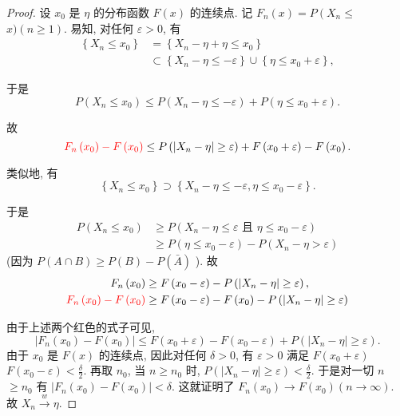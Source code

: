 \begin{proof}
    设 $x_0$ 是 $\eta$ 的分布函数 $F(x)$ 的连续点. 记 $F_n(x)=P\left(X_n \leq\right.$ $x)(n \geq 1)$. 易知, 对任何 $\varepsilon>0$, 有
$$
\begin{aligned}
\left\{X_n \leq x_0\right\} & =\left\{X_n-\eta+\eta \leq x_0\right\} \\
& \subset\left\{X_n-\eta \leq-\varepsilon\right\} \cup\left\{\eta \leq x_0+\varepsilon\right\},
\end{aligned}
$$

于是
$$
P\left(X_n \leq x_0\right) \leq P\left(X_n-\eta \leq-\varepsilon\right)+P\left(\eta \leq x_0+\varepsilon\right) .
$$

故$${{\color{red}F_n\left(x_0\right)-F\left(x_0\right)}} \leq P\left(\left|X_n-\eta\right| \geq \varepsilon\right)+F\left(x_0+\varepsilon\right)-F\left(x_0\right) .$$

类似地, 有
$$
\left\{X_n \leq x_0\right\} \supset\left\{X_n-\eta \leq-\varepsilon, \eta \leq x_0-\varepsilon\right\} .
$$

于是$$
\begin{aligned}
P\left(X_n \leq x_0\right) & \geq P\left(X_n-\eta \leq \varepsilon \text { 且 } \eta \leq x_0-\varepsilon\right) \\
& \geq P\left(\eta \leq x_0-\varepsilon\right)-P\left(X_n-\eta>\varepsilon\right)
\end{aligned}
$$
(因为 $P(A \cap B) \geq P(B)-P(\bar{A})$ ).
故
$$
\begin{aligned}
F_n\left(x_0\right) & \geq F\left(x_0-\varepsilon\right)-P\left(\left|X_n-\eta\right| \geq \varepsilon\right), \\
\color{red}F_n\left(x_0\right)-F\left(x_0\right) & \geq F\left(x_0-\varepsilon\right)-F\left(x_0\right)-P\left(\left|X_n-\eta\right| \geq \varepsilon\right)
\end{aligned}
$$

由于上述两个红色的式子可见, $$
\left|F_n\left(x_0\right)-F\left(x_0\right)\right| \leq F\left(x_0+\varepsilon\right)-F\left(x_0-\varepsilon\right)+P\left(\left|X_n-\eta\right| \geq \varepsilon\right) .
$$
由于 $x_0$ 是 $F(x)$ 的连续点, 因此对任何 $\delta>0$, 有 $\varepsilon>0$ 满足 $F\left(x_0+\varepsilon\right)$ $F\left(x_0-\varepsilon\right)<\frac{\delta}{2}$. 再取 $n_0$, 当 $n \geq n_0$ 时, $P\left(\left|X_n-\eta\right| \geq \varepsilon\right)<\frac{\delta}{2}$. 于是对一切 $n$ $\geq n_0$ 有 $\left|F_n\left(x_0\right)-F\left(x_0\right)\right|<\delta$. 这就证明了 $F_n\left(x_0\right) \rightarrow F\left(x_0\right)(n \rightarrow \infty)$. 故 $X_n \stackrel{w}{\longrightarrow} \eta$.
\end{proof}

